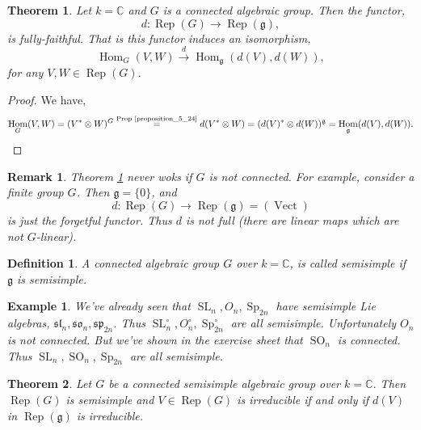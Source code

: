 \documentclass[10pt]{article}
\newtheorem{theorem}{Theorem} [section]
\newtheorem{definition}{Definition}[section]
\newtheorem{remark}{Remark}[section]
\newtheorem{example}{Example}[section]
\numberwithin{equation}{theorem}
\DeclareMathOperator{\Vect}{Vect}
\DeclareMathOperator{\SL}{SL}
\DeclareMathOperator{\SO}{SO}
\DeclareMathOperator{\Sp}{Sp}
\DeclareMathOperator{\Rep}{Rep}
\DeclareMathOperator{\Hom}{Hom}
\newcommand{\C}[0]{\mathbb{C}}
\newcommand{\g}[0]{\mathfrak{g}}
\newcommand{\spl}[0]{\mathfrak{sl}}
\newcommand{\so}[0]{\mathfrak{so}}
\newcommand{\spg}[0]{\mathfrak{sp}}
\begin{document}
\begin{theorem}
  \label{theorem_5_25}
  Let $k=\C$ and $G$ is a connected algebraic group. Then the functor,
  \begin{equation*}
    d:\Rep(G)\to\Rep(\g),
  \end{equation*}
  is fully-faithful. That is this functor induces an isomorphism,
  \begin{equation*}
    \Hom_G(V,W)\stackrel{d}{\to}\Hom_\g(d(V),d(W)),
  \end{equation*}
  for any $V,W\in\Rep(G)$.
\end{theorem}

\begin{proof}
  We have,
  \begin{equation*}
    \Hom_G(V,W) = (V^*\otimes W)^G \stackrel{\text{Prop \ref{proposition_5_24}}}{=} d(V^*\otimes W) = (d(V)^*\otimes d(W))^\g = \Hom_\g(d(V),d(W)).
  \end{equation*}
\end{proof}

\begin{remark}
  Theorem \ref{theorem_5_25} never woks if $G$ is not connected. For example, consider a finite group $G$. Then $\g=\{0\}$, and 
  \begin{equation*}
    d:\Rep(G)\to\Rep(\g) = (\Vect)
  \end{equation*}
  is just the forgetful functor. Thus $d$ is not full (there are linear maps which are not $G$-linear).
\end{remark}

\begin{definition}
  \label{definition_5_27}
  A connected algebraic group $G$ over $k=\C$, is called semisimple if $\g$ is semisimple.
\end{definition}

\begin{example}
  We've already seen that $\SL_n,O_n,\Sp_{2n}$ have semisimple Lie algebras, $\spl_n,\so_n,\spg_{2n}$. Thus $\SL_n^\circ,O_n^\circ,\Sp_{2n}^\circ$ are all semisimple. Unfortunately $O_n$ is not connected. But 
  we've shown in the exercise sheet that $\SO_n$ is connected. Thus $\SL_n,\SO_n,\Sp_{2n}$ are all semisimple.
\end{example}

\begin{theorem}
  \label{theoreme_5_29}
  Let $G$ be a connected semisimple algebraic group over $k=\C$. Then $\Rep(G)$ is semisimple and $V\in\Rep(G)$ is irreducible if and only if $d(V)$ in $\Rep(\g)$ is irreducible.
\end{theorem}
\end{document}

